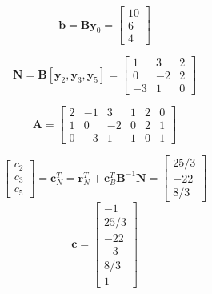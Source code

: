 \documentclass[UTF8]{ctexart}
\begin{document}
\begin{enumerate}
\begin{enumerate}
                    \[\bm{b}=\bm{B}\bm{y}_0=
                        \begin{bmatrix}
                            10 \\
                            6  \\
                            4
                        \end{bmatrix}\]

                    \[\bm{N}=\bm{B}[\bm{y}_2,\bm{y}_3,\bm{y}_5]=
                        \begin{bmatrix}
                            1  & 3  & 2 \\
                            0  & -2 & 2 \\
                            -3 & 1  & 0
                        \end{bmatrix}\]

                    \[\bm{A}=
                        \begin{bmatrix}
                            2 & −1 & 3  & 1 & 2 & 0 \\
                            1 & 0  & −2 & 0 & 2 & 1 \\
                            0 & −3 & 1  & 1 & 0 & 1
                        \end{bmatrix}\]

                    \[\begin{bmatrix}
                            c_2 \\
                            c_3 \\
                            c_5
                        \end{bmatrix}=\bm{c}^T_{N}=
                        \bm{r}^T_{N}+\bm{c}^T_B\bm{B}^{-1}\bm{N}=
                        \begin{bmatrix}
                            25/3 \\
                            -22  \\
                            8/3
                        \end{bmatrix}
                    \]
                    \[\bm{c}=
                        \begin{bmatrix}
                            -1   \\
                            25/3 \\
                            -22  \\
                            -3   \\
                            8/3  \\
                            1
                        \end{bmatrix}
                    \]


\end{enumerate}
\end{enumerate}
\end{document}

